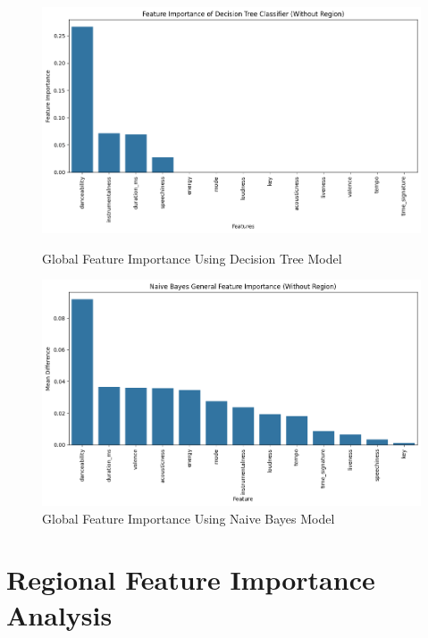 \begin{figure}[h]
    \centering
    \begin{minipage}{0.45\textwidth}
        \centering
        \includegraphics[width=\linewidth]{media/decision_tree_fea_imp_global.png}
        \caption{Global Feature Importance Using Decision Tree Model}
    \end{minipage}%
    \hspace{0.05\textwidth} %
    \begin{minipage}{0.45\textwidth}
        \centering
        \includegraphics[width=\linewidth]{media/naive_bayes_fea_imp_global.png}
        \caption{Global Feature Importance Using Naive Bayes Model}
    \end{minipage}
\end{figure}

\newpage

\section{Regional Feature Importance Analysis}


